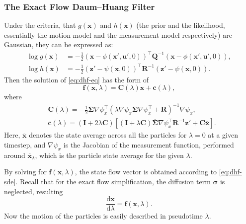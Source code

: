 \subsubsection{The Exact Flow Daum--Huang Filter}

Under the criteria, that $g(\mathbf{x})$ and $h(\mathbf{x})$ (the prior and the likelihood, essentially the motion model and the measurement model respectively) are Gaussian,
they can be expressed as:
\begin{align}
  \log g(\mathbf{x}) & =-\frac{1}{2}(\mathbf{x}-\phi(\mathbf{x}',\mathbf{u}',0))^{\top} \mathbf{Q}^{-1}(\mathbf{x}-\phi(\mathbf{x}',\mathbf{u}',0)),            \\
  \log h(\mathbf{x}) & =-\frac{1}{2}(\mathbf{z}'-\psi(\mathbf{x},0))^{\top} \mathbf{R}^{-1}(\mathbf{z}'-\psi(\mathbf{x},0)). \label{eq:explicit-log-likelihood}
\end{align}
Then the solution of \eqref{eq:dhf-eq} has the form of
\begin{equation}\label{eq:edh-flow-vector}
  \mathbf{f}(\mathbf{x},\lambda) = \mathbf{C}(\lambda)\mathbf{x} + \mathbf{c}(\lambda),
\end{equation}
where
\begin{align}
   & \mathbf{C}(\lambda) = -\frac{1}{2}\mathbf{\mathbf{\overline\Sigma}}\nabla \psi_x^\top\left(\lambda \nabla \psi_x\mathbf{\overline\Sigma}\nabla \psi_x^\top + \mathbf{R}\right)^{-1}\nabla \psi_x,\label{eq:edh-C}                              \\
   & \mathbf{c}(\lambda) = \left(\mathbf{I}+2\lambda\mathbf{C}\right)\left[\left(\mathbf{I}+\lambda\mathbf{C}\right)\mathbf{\overline\Sigma}\nabla \psi_x^\top\mathbf{R}^{-1}\mathbf{z}' + \mathbf{C}\overline{\mathbf{x}}\right]. \label{eq:edh-c}
\end{align}
Here, $\overline{\mathbf{x}}$ denotes the state average across all the particles for $\lambda = 0$ at a given timestep,
and $\nabla \psi_x$ is the Jacobian of the measurement function, performed around $\overline{\mathbf{x}}_\lambda$,
which is the particle state average for the given $\lambda$.

By solving for $\mathbf{f}(\mathbf{x},\lambda)$,
the state flow vector is obtained according to \eqref{eq:dhf-sde}.
Recall that for the exact flow simplification, the diffusion term $\boldsymbol\sigma$ is
neglected, resulting
\begin{equation}
  \frac{\mathrm{d}\mathbf{x}}{\mathrm{d}\lambda} = \mathbf{f}(\mathbf{x},\lambda).
\end{equation}
Now the motion of the particles is easily described in pseudotime $\lambda$.

